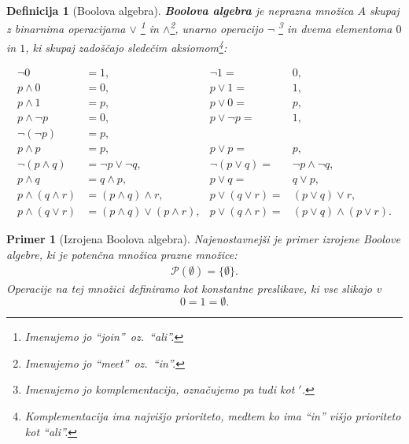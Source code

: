 \documentclass{amsart}
\newtheorem{definicija}[izrek]{Definicija}
\newtheorem{primer}[izrek]{Primer}
\begin{document}
\begin{definicija}[Boolova algebra]
    {\bf Boolova algebra} je neprazna množica \(A\) skupaj z binarnima operacijama \(\vee\) \footnote{Imenujemo jo ``join''\ oz.\ 
    ``ali''.} in \(\wedge\)\footnote{Imenujemo jo ``meet''\ oz.\ ``in''.}, unarno operacijo \(\neg\)
    \footnote{Imenujemo jo komplementacija, označujemo pa tudi kot \('\).} in dvema  
    elementoma \(0\) in \(1\), ki skupaj zadoščajo sledečim aksiomom\footnote{Komplementacija ima najvišjo prioriteto, medtem ko ima ``in'' višjo prioriteto kot ``ali''.}:

    \begin{align}
        \label{eq0}
        \neg 0 &= 1, & \neg 1 =& 0,\\ \label{eq1}
        p \wedge 0 &= 0, & p \vee 1 =& 1,\\ \label{eq2}
        p \wedge 1 &= p, & p \vee 0 =& p,\\ \label{eq3}
        p \wedge \neg p &= 0, & p \vee \neg p =& 1,\\ \label{eq4}
         \neg (\neg p) &= p,\\ \label{eq5}
        p \wedge p &= p, & p \vee p =& p,\\ \label{eq6}
        \neg (p \wedge q) &= \neg p \vee \neg q, & \neg (p \vee q) =& \neg p \wedge \neg q,\\ \label{eq7}
        p \wedge q &= q \wedge p, & p \vee q =& q \vee p,\\ \label{eq8}
        p \wedge (q \wedge r) &= (p \wedge q) \wedge r, & p \vee (q \vee r) =& (p \vee q) \vee r,\\ \label{eq9}
        p \wedge (q \vee r) &= (p \wedge q) \vee (p \wedge r), & p \vee (q \wedge r) =& (p \vee q) \wedge (p \vee r).
    \end{align}
    
\end{definicija}

\begin{primer}[Izrojena Boolova algebra]
    Najenostavnejši je primer izrojene Boolove algebre, ki je potenčna množica prazne množice:
    \begin{align*}
        \mathcal{P}\left(\emptyset\right) = \{\emptyset\}.
    \end{align*}
    Operacije na tej množici definiramo kot konstantne preslikave, ki vse slikajo v \[0 = 1 = \emptyset.\]
\end{primer}
\end{document}
